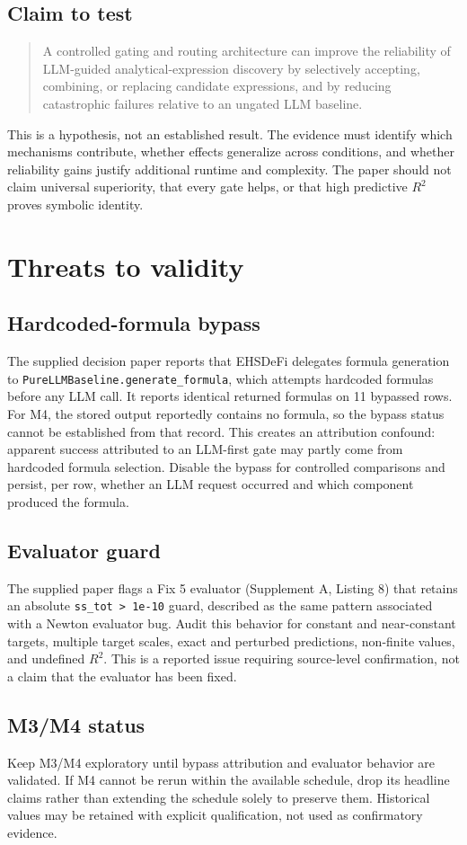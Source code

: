 \documentclass[11pt,a4paper]{article}
\begin{document}
\subsection{Claim to test}
\begin{quote}A controlled gating and routing architecture can improve the reliability of LLM-guided analytical-expression discovery by selectively accepting, combining, or replacing candidate expressions, and by reducing catastrophic failures relative to an ungated LLM baseline.\end{quote}
This is a hypothesis, not an established result. The evidence must identify which mechanisms contribute, whether effects generalize across conditions, and whether reliability gains justify additional runtime and complexity. The paper should not claim universal superiority, that every gate helps, or that high predictive $R^2$ proves symbolic identity.
\section{Threats to validity}
\subsection{Hardcoded-formula bypass}
The supplied decision paper reports that EHSDeFi delegates formula generation to \texttt{PureLLMBaseline.generate\_formula}, which attempts hardcoded formulas before any LLM call. It reports identical returned formulas on 11 bypassed rows. For M4, the stored output reportedly contains no formula, so the bypass status cannot be established from that record. This creates an attribution confound: apparent success attributed to an LLM-first gate may partly come from hardcoded formula selection. Disable the bypass for controlled comparisons and persist, per row, whether an LLM request occurred and which component produced the formula.
\subsection{Evaluator guard}
The supplied paper flags a Fix 5 evaluator (Supplement A, Listing 8) that retains an absolute \texttt{ss\_tot > 1e-10} guard, described as the same pattern associated with a Newton evaluator bug. Audit this behavior for constant and near-constant targets, multiple target scales, exact and perturbed predictions, non-finite values, and undefined $R^2$. This is a reported issue requiring source-level confirmation, not a claim that the evaluator has been fixed.
\subsection{M3/M4 status}
Keep M3/M4 exploratory until bypass attribution and evaluator behavior are validated. If M4 cannot be rerun within the available schedule, drop its headline claims rather than extending the schedule solely to preserve them. Historical values may be retained with explicit qualification, not used as confirmatory evidence.
\end{document}
